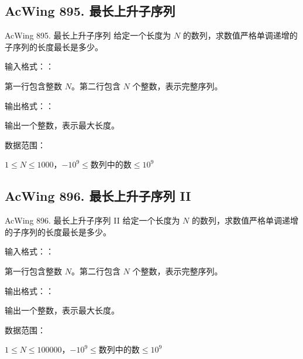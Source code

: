 \subsection{AcWing 895. 最长上升子序列}
\begin{titledbox}{AcWing 895. 最长上升子序列}
    给定一个长度为 $N$ 的数列，求数值严格单调递增的子序列的长度最长是多少。

    输入格式：：

    第一行包含整数 $N$。第二行包含 $N$ 个整数，表示完整序列。

    输出格式：：

    输出一个整数，表示最大长度。

    数据范围：

    $1 \le N \le 1000$，$-10^9 \le \text{数列中的数} \le 10^9$

    \begin{inputblock}
    \end{inputblock}
    \begin{outputblock}
    \end{outputblock}
\end{titledbox}

\subsection{AcWing 896. 最长上升子序列 II}
\begin{titledbox}{AcWing 896. 最长上升子序列 II}
    给定一个长度为 $N$ 的数列，求数值严格单调递增的子序列的长度最长是多少。

    输入格式：：

    第一行包含整数 $N$。第二行包含 $N$ 个整数，表示完整序列。

    输出格式：：

    输出一个整数，表示最大长度。

    数据范围：

    $1 \le N \le 100000$，$-10^9 \le \text{数列中的数} \le 10^9$

    \begin{inputblock}
    \end{inputblock}
    \begin{outputblock}
    \end{outputblock}
\end{titledbox}

